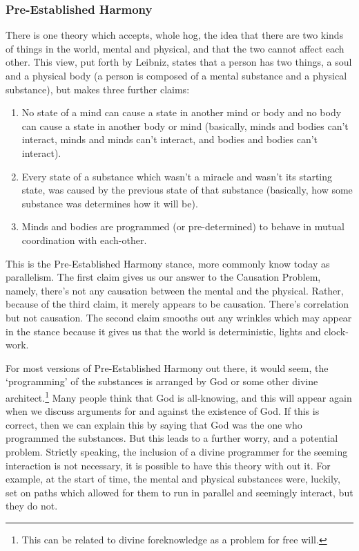 \subsubsection{Pre-Established Harmony}
There is one theory which accepts, whole hog, the idea that there are two kinds of things in the world, mental and physical, and that the two cannot affect each other. This view, put forth by Leibniz,\autocite[p. 33]{Leibniz2} states that a person has two things, a soul and a physical body (a person is composed of a mental substance and a physical substance), but makes three further claims:
\begin{enumerate}
    \item No state of a mind can cause a state in another mind or body and no body can cause a state in another body or mind (basically, minds and bodies can't interact, minds and minds can't interact, and bodies and bodies can't interact).
    \item Every state of a substance which wasn't a miracle and wasn't its starting state, was caused by the previous state of that substance (basically, how some substance was determines how it will be).
    \item Minds and bodies are programmed (or pre-determined) to behave in mutual coordination with each-other. 
\end{enumerate}
This is the Pre-Established Harmony stance, more commonly know today as \Gls{parallelism}. The first claim gives us our answer to the Causation Problem, namely, there's not any causation between the mental and the physical. Rather, because of the third claim, it merely appears to be causation. There's correlation but not causation. The second claim smooths out any wrinkles which may appear in the stance because it gives us that the world is deterministic, lights and clock-work. 

For most versions of Pre-Established Harmony out there, it would seem, the `programming' of the substances is arranged by God or some other divine architect.\footnote{This can be related to divine foreknowledge as a problem for free will.} Many people think that God is all-knowing, and this will appear again when we discuss arguments for and against the existence of God. If this is correct, then we can explain this by saying that God was the one who programmed the substances. But this leads to a further worry, and a potential problem. Strictly speaking, the inclusion of a divine programmer for the seeming interaction is not necessary, it is possible to have this theory with out it. For example, at the start of time, the mental and physical substances were, luckily, set on paths which allowed for them to run in parallel and seemingly interact, but they do not. 

